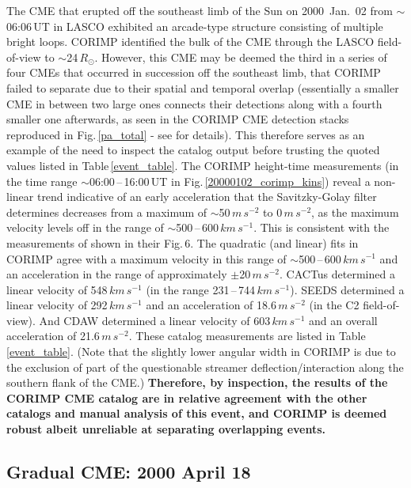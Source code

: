 \documentclass[referee,a4paper,12pt,traditabstract]{swsc}
\begin{document}
\begin{linenumbers}
The CME that erupted off the southeast limb of the Sun on 2000~Jan.~02 from $\sim$06:06\,UT in LASCO exhibited an arcade-type structure consisting of multiple bright loops. CORIMP identified the bulk of the CME through the LASCO field-of-view to $\sim$24\,$R_\odot$. However, this CME may be deemed the third in a series of four CMEs that occurred in succession off the southeast limb, that CORIMP failed to separate due to their spatial and temporal overlap (essentially a smaller CME in between two large ones connects their detections along with a fourth smaller one afterwards, as seen in the CORIMP CME detection stacks reproduced in Fig.\,\ref{pa_total} - see \citealt{2012ApJ...752..145B} for details). This therefore serves as an example of the need to inspect the catalog output before trusting the quoted values listed in Table\,\ref{event_table}. The CORIMP height-time measurements (in the time range $\sim$06:00\,--\,16:00\,UT in Fig.\,\ref{20000102_corimp_kins}) reveal a non-linear trend indicative of an early acceleration that the Savitzky-Golay filter determines decreases from a maximum of $\sim$50\,$m\,s^{-2}$ to 0\,$m\,s^{-2}$, as the maximum velocity levels off in the range of $\sim$500\,--\,600\,$km\,s^{-1}$. This is consistent with the measurements of \cite{2009A&A...495..325B} shown in their Fig.\,6. The quadratic (and linear) fits in CORIMP agree with a maximum velocity in this range of $\sim$500\,--\,600\,$km\,s^{-1}$ and an acceleration in the range of approximately $\pm$20\,$m\,s^{-2}$. CACTus determined a linear velocity of 548\,$km\,s^{-1}$ (in the range 231\,--\,744\,$km\,s^{-1}$). SEEDS determined a linear velocity of 292\,$km\,s^{-1}$ and an acceleration of 18.6\,$m\,s^{-2}$ (in the C2 field-of-view). And CDAW determined a linear velocity of 603\,$km\,s^{-1}$ and an overall acceleration of 21.6\,$m\,s^{-2}$. These catalog measurements are listed in Table\,\ref{event_table}. (Note that the slightly lower angular width in CORIMP is due to the exclusion of part of the questionable streamer deflection/interaction along the southern flank of the CME.) {\bf Therefore, by inspection, the results of the CORIMP CME catalog are in relative agreement with the other catalogs and manual analysis of this event, and CORIMP is deemed robust albeit unreliable at separating overlapping events.}


\subsection{Gradual CME: 2000 April 18}



\end{linenumbers}
\end{document}
